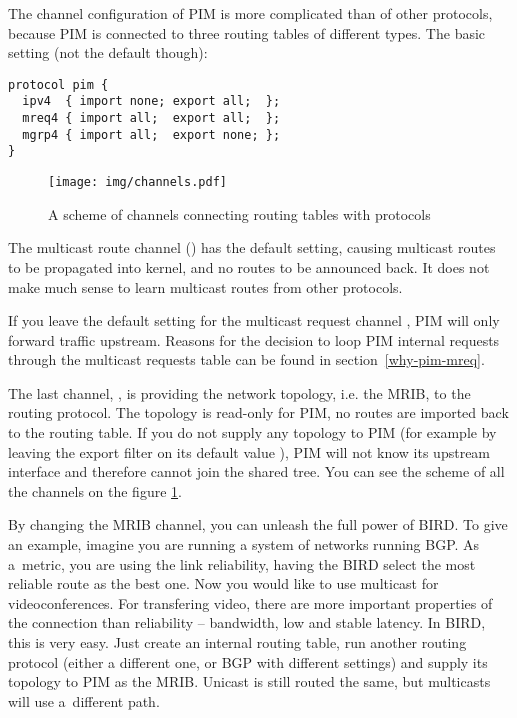 The channel configuration of PIM is more complicated than of other protocols,
because PIM is connected to three routing tables of different types. The basic
setting (not the default though):

\begin{lstlisting}
protocol pim {
  ipv4  { import none; export all;  };
  mreq4 { import all;  export all;  };
  mgrp4 { import all;  export none; };
}
\end{lstlisting}

\begin{figure}[htp]
\centering
\texttt{[image: img/channels.pdf]}
\caption{A scheme of channels connecting routing tables with protocols}
\label{channels}
\end{figure}

\noindent The multicast route channel () has the default setting, causing
multicast routes to be propagated into kernel, and no routes to be announced
back. It does not make much sense to learn multicast routes from other
protocols.

If you leave the default  setting for the multicast request
channel , PIM will only forward traffic upstream. Reasons for the
decision to loop PIM internal requests through the multicast requests table can
be found in section~\ref{why-pim-mreq}.

The last channel, , is providing the network topology, i.e. the MRIB,
to the routing protocol. The topology is read-only for PIM, no routes are
imported back to the routing table. If you do not supply any topology to PIM
(for example by leaving the export filter on its default value ), PIM
will not know its upstream interface and therefore cannot join the shared
tree. You can see the scheme of all the channels on the figure \ref{channels}.

By changing the MRIB channel, you can unleash the full power of BIRD. To give
an example, imagine you are running a system of networks running BGP. As
a~metric, you are using the link reliability, having the BIRD select the most
reliable route as the best one. Now you would like to use multicast for
videoconferences. For transfering video, there are more important properties of
the connection than reliability -- bandwidth, low and stable latency. In BIRD,
this is very easy. Just create an internal routing table, run another routing
protocol (either a different one, or BGP with different settings) and supply
its topology to PIM as the MRIB. Unicast is still routed the same, but
multicasts will use a~different path.

